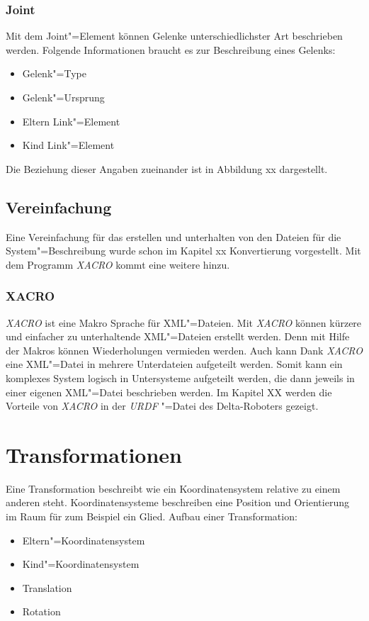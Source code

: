 \subsubsection*{Joint}
Mit dem Joint"=Element können Gelenke unterschiedlichster Art beschrieben werden.
Folgende Informationen braucht es zur Beschreibung eines Gelenks:
\begin{itemize}
\item Gelenk"=Type
\item Gelenk"=Ursprung
\item Eltern Link"=Element
\item Kind Link"=Element
\end{itemize}
Die Beziehung dieser Angaben  zueinander ist in Abbildung xx dargestellt.


\subsection{Vereinfachung}
Eine Vereinfachung für das erstellen und unterhalten von den Dateien für die System"=Beschreibung wurde schon im Kapitel xx Konvertierung vorgestellt. %
Mit dem Programm \textit{XACRO} kommt eine weitere hinzu. 

\subsubsection{XACRO} %
\textit{XACRO} ist eine Makro Sprache für XML"=Dateien. %
Mit \textit{XACRO} können kürzere und einfacher zu unterhaltende XML"=Dateien erstellt werden.
Denn mit Hilfe der Makros können Wiederholungen vermieden werden.
Auch kann Dank \textit{XACRO} eine XML"=Datei in mehrere Unterdateien aufgeteilt werden.
Somit kann ein komplexes System logisch in Untersysteme aufgeteilt werden, die dann jeweils in einer eigenen XML"=Datei beschrieben werden. 
Im Kapitel XX werden die Vorteile von \textit{XACRO} in der \textit{URDF} "=Datei des Delta-Roboters gezeigt.

\section{Transformationen} %
Eine Transformation beschreibt wie ein Koordinatensystem relative zu einem anderen steht.
Koordinatensysteme beschreiben eine Position und Orientierung im Raum für zum Beispiel ein Glied.
Aufbau einer Transformation:
\begin{itemize}
\item Eltern"=Koordinatensystem
\item Kind"=Koordinatensystem
\item Translation
\item Rotation
\end{itemize}

